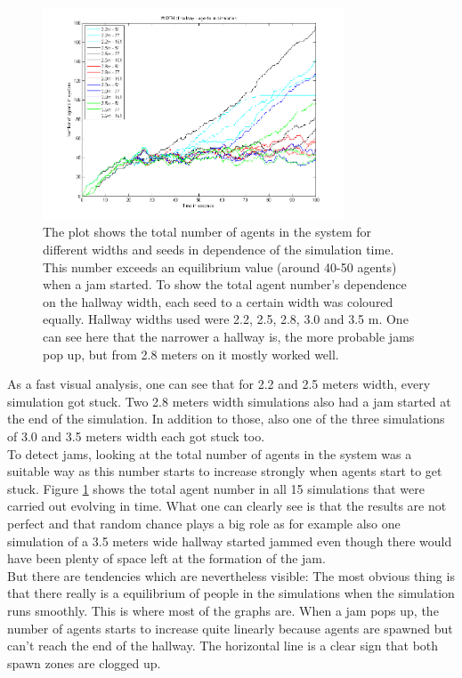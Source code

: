 
\begin{figure}[h!]
	\centering
		\includegraphics[width=0.80\textwidth]{pictures/AallInOne.png}
	\caption{The plot shows the total number of agents in the system for different widths and seeds in dependence of the simulation time. This number exceeds an equilibrium value (around 40-50 agents) when a jam started. To show the total agent number's dependence on the hallway width, each seed to a certain width was coloured equally. Hallway widths used were 2.2, 2.5, 2.8, 3.0 and 3.5 m. One can see here that the narrower a hallway is, the more probable jams pop up, but from 2.8 meters on it mostly worked well.}
	\label{fig:WidthAllInOne}
\end{figure}

\noi As a fast visual analysis, one can see that for 2.2 and 2.5 meters width, every simulation got stuck. Two 2.8 meters width simulations also had a jam started at the end of the simulation. In addition to those, also one of the three simulations of 3.0 and 3.5 meters width each got stuck too.\\

\noi To detect jams, looking at the total number of agents in the system was a suitable way as this number starts to increase strongly when agents start to get stuck. Figure \ref{fig:WidthAllInOne} shows the total agent number in all 15 simulations that were carried out evolving in time. What one can clearly see is that the results are not perfect and that random chance plays a big role as for example also one simulation of a 3.5 meters wide hallway started jammed even though there would have been plenty of space left at the formation of the jam.\\
But there are tendencies which are nevertheless visible: The most obvious thing is that there really is a equilibrium of people in the simulations when the simulation runs smoothly. This is where most of the graphs are. When a jam pops up, the number of agents starts to increase quite linearly because agents are spawned but can't reach the end of the hallway. The horizontal line is a clear sign that both spawn zones are clogged up.\\

